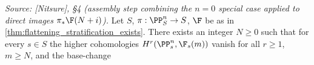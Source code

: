 \begin{lemma}
  \label{lem:noetherian_induction_strata}

  \textit{Source: [Nitsure], \S4 (assembly step combining the \(n=0\) special case
  applied to direct images \(\pi_*\F(N+i)\)).}
  Let \(S\), \(\pi : \PP^n_S \to S\), \(\F\) be as in
  \cref{thm:flattening_stratification_exists}.  There exists an integer
  \(N \ge 0\) such that for every \(s \in S\) the higher cohomologies
  \(H^r(\PP^n_s, \F_s(m))\) vanish for all \(r \ge 1\), \(m \ge N\), and the base-change

\end{lemma}
